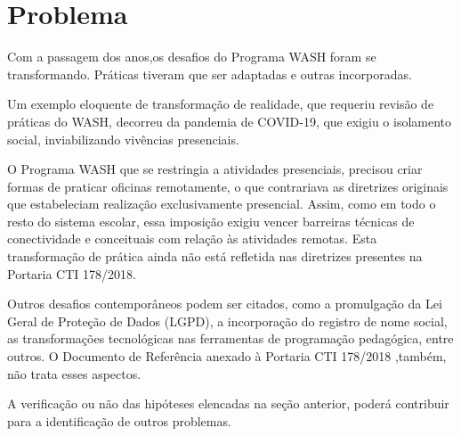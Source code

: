 \documentclass[
12pt,		%
openright,	%
twoside,  %
a4paper,			%
chapter=TITLE,		%
english,			%
french,				%
spanish,			%
brazil				%
]{USPSC-classe/USPSC}
\begin{document}
\noindent\begin{center}\mbox{\centering{}}\end{center}


\section[Problema]{Problema}\label{Problema}
Com a passagem dos anos,os desafios do Programa WASH foram se transformando. Pr\'aticas tiveram que ser adaptadas e outras incorporadas.








Um exemplo eloquente de transforma\c{c}\~ao de realidade, que requeriu revis\~ao de pr\'aticas do WASH, decorreu da pandemia de COVID-19, que exigiu o isolamento social, inviabilizando viv\^encias presenciais.








O Programa WASH que se restringia a atividades presenciais, precisou criar formas de praticar oficinas remotamente, o que contrariava as diretrizes originais que estabeleciam  realiza\c{c}\~ao exclusivamente presencial. Assim, como em todo o resto do sistema escolar, essa imposi\c{c}\~ao exigiu vencer barreiras t\'ecnicas de conectividade e conceituais com rela\c{c}\~ao \`as atividades remotas. Esta transforma\c{c}\~ao de pr\'atica ainda n\~ao est\'a refletida nas diretrizes presentes na Portaria CTI 178/2018.








Outros desafios contempor\^aneos podem ser citados, como a promulga\c{c}\~ao da Lei Geral de Prote\c{c}\~ao de Dados (LGPD), a incorpora\c{c}\~ao do registro de nome social, as transforma\c{c}\~oes tecnol\'ogicas nas ferramentas de programa\c{c}\~ao pedag\'ogica, entre outros. O Documento de Refer\^encia anexado \`a Portaria CTI 178/2018 ,tamb\'em, n\~ao trata esses aspectos.








A verifica\c{c}\~ao ou n\~ao das hip\'oteses elencadas na se\c{c}\~ao anterior, poder\'a contribuir para a identifica\c{c}\~ao de outros problemas.
\end{document}
